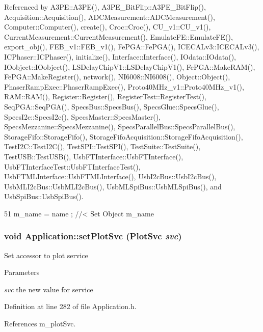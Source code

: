 Referenced by A3PE::A3PE(), A3PE\_\-BitFlip::A3PE\_\-BitFlip(), Acquisition::Acquisition(), ADCMeasurement::ADCMeasurement(), Computer::Computer(), create(), Croc::Croc(), CU\_\-v1::CU\_\-v1(), CurrentMeasurement::CurrentMeasurement(), EmulateFE::EmulateFE(), export\_\-obj(), FEB\_\-v1::FEB\_\-v1(), FePGA::FePGA(), ICECALv3::ICECALv3(), ICPhaser::ICPhaser(), initialize(), Interface::Interface(), IOdata::IOdata(), IOobject::IOobject(), LSDelayChipV1::LSDelayChipV1(), FePGA::MakeRAM(), FePGA::MakeRegister(), network(), NI6008::NI6008(), Object::Object(), PhaserRampExec::PhaserRampExec(), Proto40MHz\_\-v1::Proto40MHz\_\-v1(), RAM::RAM(), Register::Register(), RegisterTest::RegisterTest(), SeqPGA::SeqPGA(), SpecsBus::SpecsBus(), SpecsGlue::SpecsGlue(), SpecsI2c::SpecsI2c(), SpecsMaster::SpecsMaster(), SpecsMezzanine::SpecsMezzanine(), SpecsParallelBus::SpecsParallelBus(), StorageFifo::StorageFifo(), StorageFifoAcquisition::StorageFifoAcquisition(), TestI2C::TestI2C(), TestSPI::TestSPI(), TestSuite::TestSuite(), TestUSB::TestUSB(), UsbFTInterface::UsbFTInterface(), UsbFTInterfaceTest::UsbFTInterfaceTest(), UsbFTMLInterface::UsbFTMLInterface(), UsbI2cBus::UsbI2cBus(), UsbMLI2cBus::UsbMLI2cBus(), UsbMLSpiBus::UsbMLSpiBus(), and UsbSpiBus::UsbSpiBus().


\begin{DoxyCode}
51 { m_name  = name  ; } //< Set Object m_name
\end{DoxyCode}
\hypertarget{classApplication_ac11402510105adf9a9ccf3daa25ea7d4}{
\subsubsection[{setPlotSvc}]{\setlength{\rightskip}{0pt plus 5cm}void Application::setPlotSvc ({\bf PlotSvc} {\em svc})}}
\label{classApplication_ac11402510105adf9a9ccf3daa25ea7d4}
Set accessor to plot service 
\begin{DoxyParams}{Parameters}
\item[{\em svc}]the new value for service \end{DoxyParams}


Definition at line 282 of file Application.h.

References m\_\-plotSvc.


